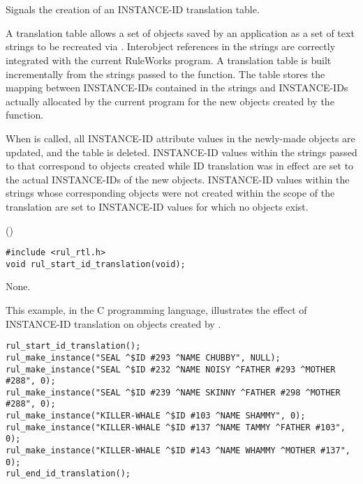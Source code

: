 \begin{seealso}



\end{seealso}

\section*{}

Signals the creation of an INSTANCE-ID translation table.

A translation table allows a set of objects saved by an application as
a set of text strings to be recreated via
. Interobject references in the strings are
correctly integrated with the current RuleWorks program. A translation
table is built incrementally from the strings passed to the
 function. The table stores the mapping
between INSTANCE-IDs contained in the strings and INSTANCE-IDs
actually allocated by the current program for the new objects created
by the  function.

When  is called, all INSTANCE-ID
attribute values in the newly-made objects are updated, and the table
is deleted.  INSTANCE-ID values within the strings passed to
 that correspond to objects created while ID
translation was in effect are set to the actual INSTANCE-IDs of the
new objects. INSTANCE-ID values within the strings whose corresponding
objects were not created within the scope of the translation are set
to INSTANCE-ID values for which no objects exist.

\Syntax

()

\CBinding
\begin{verbatim}
#include <rul_rtl.h>
void rul_start_id_translation(void);
\end{verbatim}

\Arguments

None.

\Example

This example, in the C programming language, illustrates the effect of
INSTANCE-ID translation on objects created by .

\begin{verbatim}
rul_start_id_translation();
rul_make_instance("SEAL ^$ID #293 ^NAME CHUBBY", NULL);
rul_make_instance("SEAL ^$ID #232 ^NAME NOISY ^FATHER #293 ^MOTHER #288", 0);
rul_make_instance("SEAL ^$ID #239 ^NAME SKINNY ^FATHER #298 ^MOTHER #288", 0);
rul_make_instance("KILLER-WHALE ^$ID #103 ^NAME SHAMMY", 0);
rul_make_instance("KILLER-WHALE ^$ID #137 ^NAME TAMMY ^FATHER #103", 0);
rul_make_instance("KILLER-WHALE ^$ID #143 ^NAME WHAMMY ^MOTHER #137", 0);
rul_end_id_translation(); 
\end{verbatim}

